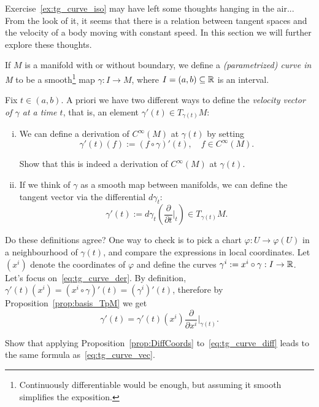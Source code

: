 Exercise~\ref{ex:tg_curve_iso} may have left some thoughts hanging in the air...
From the look of it, it seems that there is a relation between tangent spaces and the velocity of a body moving with constant speed.
In this section we will further explore these thoughts.

\begin{definition}
	If $M$ is a manifold with or without boundary, we define a \emph{(parametrized) curve in M} to be a smooth\footnote{Continuously differentiable would be enough, but assuming it smooth simplifies the exposition.} map $\gamma : I \to M$, where $I=(a,b)\subseteq\mathbb{R}$ is an interval.
\end{definition}

Fix $t\in(a,b)$.
A priori we have two different ways to define the \emph{velocity vector of $\gamma$ at a time $t$}, that is, an element $\gamma'(t) \in T_{\gamma(t)}M$:
\begin{enumerate}[(i)]
	\item We can define a derivation of $C^\infty(M)$ at $\gamma(t)$ by setting
	      \begin{equation}\label{eq:tg_curve_der}
		      \gamma'(t) (f) := (f\circ\gamma)'(t), \quad f\in C^\infty(M).
	      \end{equation}
	      \begin{exercise}
		      Show that this is indeed a derivation of $C^\infty(M)$ at $\gamma(t)$.
	      \end{exercise}
	\item If we think of $\gamma$ as a smooth map between manifolds, we can define the tangent vector via the differential $d\gamma_t$:
	      \begin{equation}\label{eq:tg_curve_diff}
		      \gamma'(t):= d\gamma_t\left(\frac{\partial}{\partial t}\Big|_t\right) \in T_{\gamma(t)}M.
	      \end{equation}
\end{enumerate}

Do these definitions agree?
One way to check is to pick a chart $\varphi: U \to \varphi(U)$ in a neighbourhood of $\gamma(t)$, and compare the expressions in local coordinates. Let $(x^i)$ denote the coordinates of $\varphi$ and define the curves $\gamma^i := x^i \circ \gamma : I\to\mathbb{R}$.
Let's focus on~\eqref{eq:tg_curve_der}. By definition, $\gamma'(t)(x^i) = (x^i\circ\gamma)'(t) = (\gamma^i)'(t)$, therefore by Proposition~\ref{prop:basis_TpM} we get
\begin{equation}\label{eq:tg_curve_vec}
	\gamma'(t) = %
	\gamma'(t)(x^i) \frac{\partial}{\partial x^i}\Big|_{\gamma(t)}.
\end{equation}
\begin{exercise}
	Show that applying Proposition~\ref{prop:DiffCoords} to~\eqref{eq:tg_curve_diff} leads to the same formula as~\eqref{eq:tg_curve_vec}.
\end{exercise}

